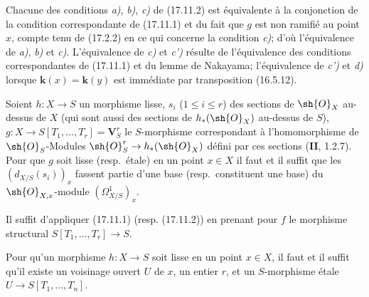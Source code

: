 Chacune des conditions \emph{a)}, \emph{b)}, \emph{c)} de (17.11.2) est équivalente à la conjonction de la condition correspondante de (17.11.1) et du fait que $g$ est non ramifié au point $x$, compte tenu de (17.2.2) en ce qui concerne la condition \emph{c)}; d'où l'équivalence de \emph{a)}, \emph{b)} et \emph{c)}. L'équivalence de \emph{c)} et \emph{c')} résulte de l'équivalence des conditions correspondantes de (17.11.1) et du lemme de Nakayama; l'équivalence de \emph{c')} et \emph{d)} lorsque $\boldsymbol{k}(x)=\boldsymbol{k}(y)$ est immédiate par transposition (16.5.12).

\begin{corollary}[17.11.3]
\label{IV.17.11.3}
Soient $h:X\to S$ un morphisme lisse, $s_i$ \textup{($1\leq i\leq r$)} des sections de $\sh{O}_X$ au-dessus de $X$ \textup{(}qui sont aussi des sections de $h_*(\sh{O}_X)$ au-dessus de $S$\textup{)}, $g:X\to S[T_1,\ldots,T_r]=\mathbf{V}_S^r$ le $S$-morphisme correspondant à l'homomorphisme de $\sh{O}_S$-Modules $\sh{O}_S^r\to h_*(\sh{O}_X)$ défini par ces sections \textup{(\textbf{II}, 1.2.7)}. Pour que $g$ soit lisse \textup{(resp.}\ étale\textup{)} en un point $x\in X$ il faut et il suffit que les $(d_{X/S}(s_i))_x$ fassent partie d'une base \textup{(resp.}\ constituent une base\textup{)} du $\sh{O}_{X,x}$-module $(\varOmega^1_{X/S})_x$.
\end{corollary}

Il suffit d'appliquer (17.11.1) (resp. (17.11.2)) en prenant pour $f$ le morphisme structural $S[T_1,\ldots,T_r]\to S$.

\begin{corollary}[17.11.4]
\label{IV.17.11.4}
Pour qu'un morphisme $h:X\to S$ soit lisse en un point $x\in X$, il faut et il suffit qu'il existe un voisinage ouvert $U$ de $x$, un entier $r$, et un $S$-morphisme étale $U\to S[T_1,\ldots,T_n]$.
\end{corollary}

